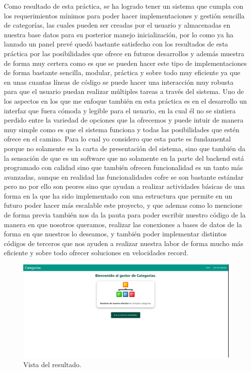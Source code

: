 \documentclass[10pt,a4paper]{article}
\begin{document}
Como resultado de esta práctica, se ha logrado tener un sistema que cumpla con los requerimientos mínimos para poder hacer implementaciones y gestión sencilla de categorías, las cuales pueden ser creadas por el usuario y almacenadas en nuestra base datos para su posterior manejo inicialización, por lo como ya ha lanzado un panel prevé quedó bastante satisfecho con los resultados de esta práctica por las posibilidades que ofrece en futuros desarrollos y además muestra de forma muy certera como es que se pueden hacer este tipo de implementaciones de forma bastante sencilla, modular, práctica y sobre todo muy eficiente ya que en unas cuantas líneas de código se puede hacer una interacción muy robusta para que el usuario puedan realizar múltiples tareas a través del sistema.
\vspace{5mm}
Uno de los aspectos en los que me enfoque también en esta práctica es en el desarrollo un interfaz que fuera cómoda y legible para el usuario, en la cual él no se sintiera perdido entre la variedad de opciones que la ofrecemos y puede intuir de manera muy simple como es que el sistema funciona y todas las posibilidades que estén ofrece en el camino.
\vspace{5mm}
Para lo cual yo considero que esta parte es fundamental porque no solamente es la carta de presentación del sistema, sino que también da la sensación de que es un software que no solamente en la parte del backend está programado con calidad sino que también ofrecen funcionalidad es un tanto más avanzadas, aunque en realidad las funcionalidades cofre se son bastante estándar pero no por ello son peores sino que ayudan a realizar actividades básicas de una forma en la que ha sido implementado con una estructura que permite en un futuro poder hacer más escalable este proyecto, y que ademas como lo mencione de forma previa también nos da la pauta para poder escribir nuestro código de la manera en que nosotros queramos, realizar las conexiones a bases de datos de la forma en que nuestros lo deseamos, y también poder implementar distintos códigos de terceros que nos ayuden a realizar nuestra labor de forma mucho más eficiente y sobre todo ofrecer soluciones en velocidades record.

\begin{figure}[h]
\centering
\includegraphics[width=13cm]{2}
\caption{Vista del resultado.}
\label{fig:figure1}
\end{figure}
\end{document}
